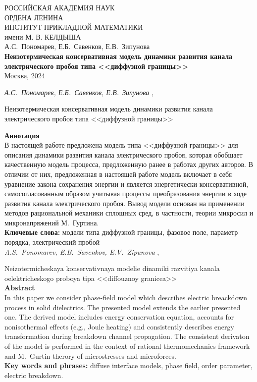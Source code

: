 \documentclass[a4paper,12pt]{article}
\theoremstyle{plain}
\theoremstyle{remark}
\newcommand{\PreprintTitle}{
	Неизотермическая консервативная модель динамики развития
	канала электрического пробоя типа <<диффузной границы>>
}
\newcommand{\PreprintTitleEnglish}{
	Neizotermicheskaya konservativnaya modelie dinamiki razvitiya
	kanala oelektricheskogo proboya tipa <<diffouznoy granicea>>
}
\newcommand{\PreprintAuthors}{
	А.С.~Пономарев, Е.Б.~Савенков, Е.В.~Зипунова
}
\newcommand{\PreprintAuthorsEnglish}{
	A.S.~Ponomarev, E.B.~Savenkov, E.V.~Zipunova
}
\begin{document}
\begin{titlepage}

\begin{center}
	РОССИЙСКАЯ АКАДЕМИЯ НАУК \\
	ОРДЕНА ЛЕНИНА \\
	ИНСТИТУТ ПРИКЛАДНОЙ МАТЕМАТИКИ \\
	имени М. В. КЕЛДЫША \\

	\vspace*{60mm}
	\Large{\PreprintAuthors} \\
	\vspace*{20mm}
	\textbf{\large \PreprintTitle} \\
	\vspace*{110mm}
	\Large{Москва, 2024}
	\vspace*{-50mm}
\end{center}

\end{titlepage}

\setcounter{page}{2}

\thispagestyle{empty}

\noindent \emph{\PreprintAuthors}, 
\PreprintTitle
\vspace*{3mm}

\noindent \textbf{Аннотация} \\
{
	\small
	В настоящей работе предложена модель типа <<диффузной границы>>
	для описания динамики развития канала электрического пробоя,
	которая обобщает качественную модель процесса,
	предложенную ранее в работах других авторов.
	В отличии от них, предложенная в настоящей работе модель включает в
	себя уравнение закона сохранения энергии и является энергетически
	консервативной,
	самосогласованным образом учитывая процессы преобразования
	энергии в ходе развития канала электрического пробоя.
	Вывод модели основан на применении методов рациональной
	механики сплошных сред, в частности,
	теории микросил и микронапряжений М.~Гуртина. \\[3mm]
	\textbf{Ключевые слова:}
	модели типа диффузной границы, фазовое поле,
	параметр порядка, электрический пробой \\[5mm]
}
\emph{\PreprintAuthorsEnglish},
\PreprintTitleEnglish \\[3mm]
\textbf{Abstract} \\
{
	\small
	In this paper we consider phase-field model which describes
	electric breackdown process in solid dielectrics.
	The presented model extends the earlier presented
	one.
	The derived model includes energy conservation equation,
	accounts for nonisothermal effects (e.g., Joule heating)
	and consistently describes energy transformation during
	breakdown channel propagation.
	The consistent derivaton of the model is performed
	in the context of rational thermomechanics framework and
	M.~Gurtin therory of microstresses and microforces. \\[3mm]
	\textbf{Key words and phrases:}
	diffuse interface models, phase field, order parameter, electric breakdown. \\[5mm]
}
\end{document}

